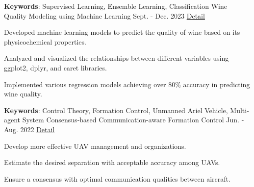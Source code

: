 

\begin{cventries}

  \cventry
  {\textbf{Keywords}: Supervised Learning, Ensemble Learning, Classification} %
  {Wine Quality Modeling using Machine Learning} %
  {Sept. - Dec. 2023} %
  {\href{https://github.com/Sang-Buster/Wine-Quality-Modeling}{ Detail}} %
  {
    \begin{cvitems} %
      \item {Developed machine learning models to predict the quality of wine based on its physicochemical properties.}
      \item {Analyzed and visualized the relationships between different variables using ggplot2, dplyr, and caret libraries.}
      \item {Implemented various regression models achieving over 80\% accuracy in predicting wine quality.}
    \end{cvitems}
  }



  \cventry
  {\textbf{Keywords}: Control Theory, Formation Control, Unmanned Ariel Vehicle, Multi-agent System} %
  {Consensus-based Communication-aware Formation Control} %
  {Jun. -Aug. 2022} %
  {\href{https://github.com/Sang-Buster/Formation-Control}{ Detail}} %
  {
    \begin{cvitems} %
      \item {Develop more effective UAV management and organizations.}
      \item {Estimate the desired separation with acceptable accuracy among UAVs.}
      \item {Ensure a consensus with optimal communication qualities between aircraft.}
    \end{cvitems}
  }\newline
  \newline




\end{cventries}
